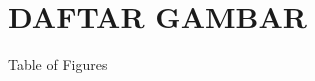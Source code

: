 \documentclass[main]{subfiles}
\begin{document}
\chapter*{DAFTAR GAMBAR}
Table of Figures
\end{document}
